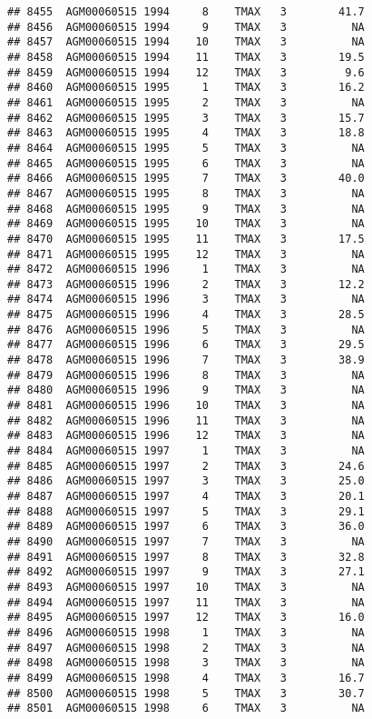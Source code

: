 \documentclass{article}\usepackage[]{graphicx}\usepackage[]{color}
\makeatletter
\newenvironment{kframe}{%
 \def\at@end@of@kframe{}%
 \ifinner\ifhmode%
  \def\at@end@of@kframe{\end{minipage}}%
  \begin{minipage}{\columnwidth}%
 \fi\fi%
 \def\FrameCommand##1{\hskip\@totalleftmargin \hskip-\fboxsep
 \colorbox{shadecolor}{##1}\hskip-\fboxsep
     \hskip-\linewidth \hskip-\@totalleftmargin \hskip\columnwidth}%
 \MakeFramed {\advance\hsize-\width
   \@totalleftmargin\z@ \linewidth\hsize
   \@setminipage}}%
 {\par\unskip\endMakeFramed%
 \at@end@of@kframe}
\newenvironment{knitrout}{}{} %
\makeatother
\begin{document}
\begin{knitrout}
\begin{kframe}
\begin{verbatim}
## 8455  AGM00060515 1994     8    TMAX   3        41.7
## 8456  AGM00060515 1994     9    TMAX   3          NA
## 8457  AGM00060515 1994    10    TMAX   3          NA
## 8458  AGM00060515 1994    11    TMAX   3        19.5
## 8459  AGM00060515 1994    12    TMAX   3         9.6
## 8460  AGM00060515 1995     1    TMAX   3        16.2
## 8461  AGM00060515 1995     2    TMAX   3          NA
## 8462  AGM00060515 1995     3    TMAX   3        15.7
## 8463  AGM00060515 1995     4    TMAX   3        18.8
## 8464  AGM00060515 1995     5    TMAX   3          NA
## 8465  AGM00060515 1995     6    TMAX   3          NA
## 8466  AGM00060515 1995     7    TMAX   3        40.0
## 8467  AGM00060515 1995     8    TMAX   3          NA
## 8468  AGM00060515 1995     9    TMAX   3          NA
## 8469  AGM00060515 1995    10    TMAX   3          NA
## 8470  AGM00060515 1995    11    TMAX   3        17.5
## 8471  AGM00060515 1995    12    TMAX   3          NA
## 8472  AGM00060515 1996     1    TMAX   3          NA
## 8473  AGM00060515 1996     2    TMAX   3        12.2
## 8474  AGM00060515 1996     3    TMAX   3          NA
## 8475  AGM00060515 1996     4    TMAX   3        28.5
## 8476  AGM00060515 1996     5    TMAX   3          NA
## 8477  AGM00060515 1996     6    TMAX   3        29.5
## 8478  AGM00060515 1996     7    TMAX   3        38.9
## 8479  AGM00060515 1996     8    TMAX   3          NA
## 8480  AGM00060515 1996     9    TMAX   3          NA
## 8481  AGM00060515 1996    10    TMAX   3          NA
## 8482  AGM00060515 1996    11    TMAX   3          NA
## 8483  AGM00060515 1996    12    TMAX   3          NA
## 8484  AGM00060515 1997     1    TMAX   3          NA
## 8485  AGM00060515 1997     2    TMAX   3        24.6
## 8486  AGM00060515 1997     3    TMAX   3        25.0
## 8487  AGM00060515 1997     4    TMAX   3        20.1
## 8488  AGM00060515 1997     5    TMAX   3        29.1
## 8489  AGM00060515 1997     6    TMAX   3        36.0
## 8490  AGM00060515 1997     7    TMAX   3          NA
## 8491  AGM00060515 1997     8    TMAX   3        32.8
## 8492  AGM00060515 1997     9    TMAX   3        27.1
## 8493  AGM00060515 1997    10    TMAX   3          NA
## 8494  AGM00060515 1997    11    TMAX   3          NA
## 8495  AGM00060515 1997    12    TMAX   3        16.0
## 8496  AGM00060515 1998     1    TMAX   3          NA
## 8497  AGM00060515 1998     2    TMAX   3          NA
## 8498  AGM00060515 1998     3    TMAX   3          NA
## 8499  AGM00060515 1998     4    TMAX   3        16.7
## 8500  AGM00060515 1998     5    TMAX   3        30.7
## 8501  AGM00060515 1998     6    TMAX   3          NA

\end{verbatim}
\end{kframe}
\end{knitrout}
\end{document}

